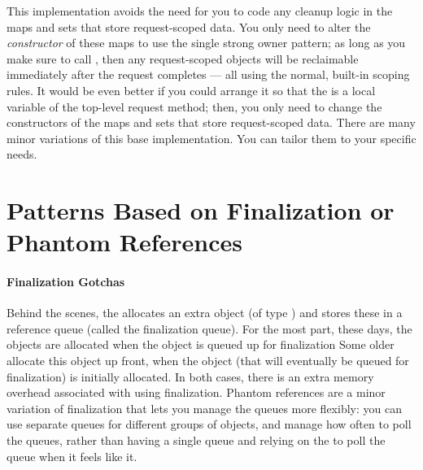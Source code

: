This implementation avoids the need for you to code any cleanup logic in the maps
and sets that store request-scoped data. You only need to alter the
\emph{constructor} of these maps to use the single strong owner pattern; as long
as you make sure to call , then any request-scoped
objects will be reclaimable immediately after the request completes --- all using
the normal, built-in scoping rules. It would be even better if you could arrange
it so that the  is a local variable of the
top-level request method; then, you only need to change the constructors of the
maps and sets that store request-scoped data. There are many minor variations of
this base implementation. You can tailor them to your specific needs.

\section{Patterns Based on Finalization or Phantom References}

\paragraph{Finalization Gotchas}

Behind the scenes,
the \jre allocates an extra object (of type
) and stores these in a reference queue
(called the finalization queue). For the most part, these days, the
 objects are allocated when the object is queued up for
finalization Some older \jres allocate this object up front, when the object
(that will eventually be queued for finalization) is initially allocated. In
both cases, there is an extra memory overhead associated with using
finalization. Phantom references are a minor variation of finalization that lets
you manage the queues more flexibly: you can use separate queues for different
groups of objects, and manage how often to poll the queues, rather than having a
single queue and relying on the \jre to poll the queue when it feels like
it.

